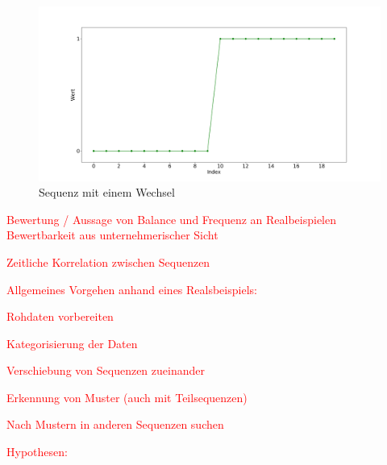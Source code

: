 \begin{figure}[H]
	\centering
		\includegraphics[scale=0.32]{images/Klassifizierung/wechsel}
	\caption{Sequenz mit einem Wechsel}
	\label{fig:wechsel}
\end{figure}

\textcolor{red}{
	Bewertung / Aussage von Balance und Frequenz an Realbeispielen\\
	Bewertbarkeit aus unternehmerischer Sicht}

\textcolor{red}{Zeitliche Korrelation zwischen Sequenzen}

\textcolor{red}{
	Allgemeines Vorgehen anhand eines Realsbeispiels:
	\begin{list}{}{}
		\item Rohdaten vorbereiten
		\item Kategorisierung der Daten 
		\item Verschiebung von Sequenzen zueinander
		\item Erkennung von Muster (auch mit Teilsequenzen)
		\item Nach Mustern in anderen Sequenzen suchen
	\end{list}
}

\textcolor{red}{
Hypothesen:
\begin{list}{}{}
	\item  
\end{list}
}
